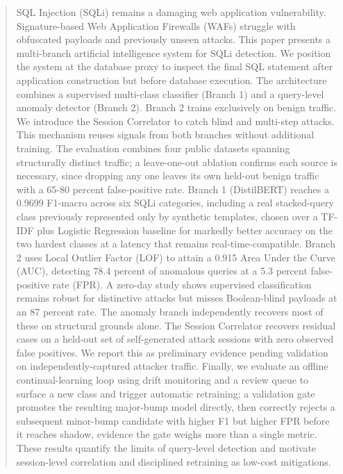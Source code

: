 \documentclass[conference]{IEEEtran}
\begin{document}
\begin{abstract}
SQL Injection (SQLi) remains a damaging web application vulnerability. Signature-based Web Application Firewalls (WAFs) struggle with obfuscated payloads and previously unseen attacks. This paper presents a multi-branch artificial intelligence system for SQLi detection. We position the system at the database proxy to inspect the final SQL statement after application construction but before database execution. The architecture combines a supervised multi-class classifier (Branch 1) and a query-level anomaly detector (Branch 2). Branch 2 trains exclusively on benign traffic. We introduce the Session Correlator to catch blind and multi-step attacks. This mechanism reuses signals from both branches without additional training. The evaluation combines four public datasets spanning structurally distinct traffic; a leave-one-out ablation confirms each source is necessary, since dropping any one leaves its own held-out benign traffic with a 65-80 percent false-positive rate. Branch 1 (DistilBERT) reaches a 0.9699 F1-macro across six SQLi categories, including a real stacked-query class previously represented only by synthetic templates, chosen over a TF-IDF plus Logistic Regression baseline for markedly better accuracy on the two hardest classes at a latency that remains real-time-compatible. Branch 2 uses Local Outlier Factor (LOF) to attain a 0.915 Area Under the Curve (AUC), detecting 78.4 percent of anomalous queries at a 5.3 percent false-positive rate (FPR). A zero-day study shows supervised classification remains robust for distinctive attacks but misses Boolean-blind payloads at an 87 percent rate. The anomaly branch independently recovers most of these on structural grounds alone. The Session Correlator recovers residual cases on a held-out set of self-generated attack sessions with zero observed false positives. We report this as preliminary evidence pending validation on independently-captured attacker traffic. Finally, we evaluate an offline continual-learning loop using drift monitoring and a review queue to surface a new class and trigger automatic retraining; a validation gate promotes the resulting major-bump model directly, then correctly rejects a subsequent minor-bump candidate with higher F1 but higher FPR before it reaches shadow, evidence the gate weighs more than a single metric. These results quantify the limits of query-level detection and motivate session-level correlation and disciplined retraining as low-cost mitigations.
\end{abstract}
\end{document}
